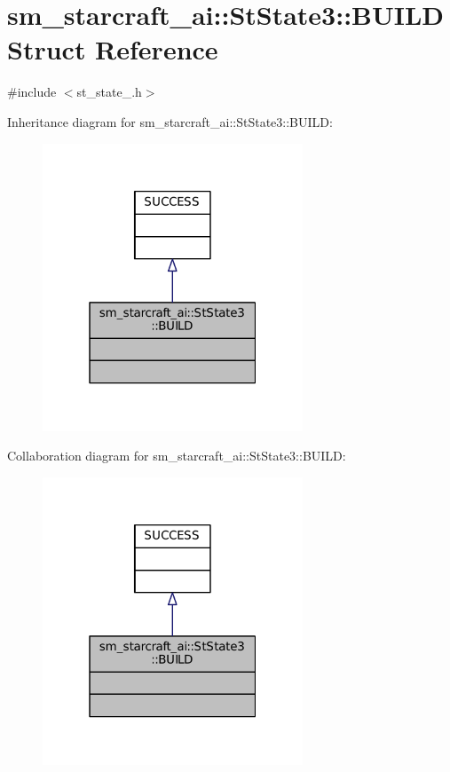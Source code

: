 \hypertarget{structsm__starcraft__ai_1_1StState3_1_1BUILD}{}\section{sm\+\_\+starcraft\+\_\+ai\+:\+:St\+State3\+:\+:B\+U\+I\+LD Struct Reference}
\label{structsm__starcraft__ai_1_1StState3_1_1BUILD}


{\ttfamily \#include $<$st\+\_\+state\+\_.\+h$>$}



Inheritance diagram for sm\+\_\+starcraft\+\_\+ai\+:\+:St\+State3\+:\+:B\+U\+I\+LD\+:
\nopagebreak
\begin{figure}[H]
\begin{center}
\leavevmode
\includegraphics[width=220pt]{structsm__starcraft__ai_1_1StState3_1_1BUILD__inherit__graph}
\end{center}
\end{figure}


Collaboration diagram for sm\+\_\+starcraft\+\_\+ai\+:\+:St\+State3\+:\+:B\+U\+I\+LD\+:
\nopagebreak
\begin{figure}[H]
\begin{center}
\leavevmode
\includegraphics[width=220pt]{structsm__starcraft__ai_1_1StState3_1_1BUILD__coll__graph}
\end{center}
\end{figure}



